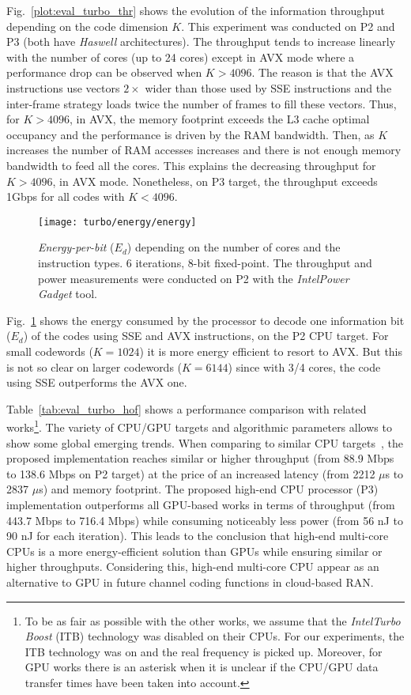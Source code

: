 Fig.~\ref{plot:eval_turbo_thr} shows the evolution of the information throughput
depending on the code dimension $K$. This experiment was conducted on P2 and P3
(both have \emph{ Haswell} architectures). The throughput tends to increase
linearly with the number of cores (up to 24 cores) except in AVX mode where a
performance drop can be observed when $K > 4096$. The reason is that the AVX
instructions use vectors $2\times$ wider than those used by SSE instructions and
the inter-frame strategy loads twice the number of frames to fill these vectors.
Thus, for $K > 4096$, in AVX, the memory footprint exceeds the L3 cache optimal
occupancy and the performance is driven by the RAM bandwidth. Then, as $K$
increases the number of RAM accesses increases and there is not enough memory
bandwidth to feed all the cores. This explains the decreasing throughput for
$K > 4096$, in AVX mode. Nonetheless, on P3 target, the throughput exceeds 1Gbps
for all codes with $K<4096$.

\begin{figure}[htp]
  \centering
  \texttt{[image: turbo/energy/energy]}
  \caption{\emph{Energy-per-bit} ($E_d$) depending on the number of cores and
    the instruction types. 6 iterations, 8-bit fixed-point. The throughput and
    power measurements were conducted on P2 with the
    \emph{Intel\R Power Gadget} tool.}
  \label{plot:eval_turbo_energy}
\end{figure}

Fig.~\ref{plot:eval_turbo_energy} shows the energy consumed by the processor to
decode one information bit ($E_d$) of the codes using SSE and AVX instructions,
on the P2 CPU target. For small codewords ($K=1024$) it is more energy efficient
to resort to AVX. But this is not so clear on larger codewords ($K=6144$) since
with 3/4 cores, the code using SSE outperforms the AVX one.

Table~\ref{tab:eval_turbo_hof} shows a performance comparison with related
works\footnote{To be as fair as possible with the other works, we assume that
the \emph{Intel\R Turbo Boost} (ITB) technology was disabled on their CPUs. For
our experiments, the ITB technology was on and the real frequency is picked up.
Moreover, for GPU works there is an asterisk when it is unclear if the CPU/GPU
data transfer times have been taken into account.}. The variety of CPU/GPU
targets and algorithmic parameters allows to show some global emerging trends.
When comparing to similar CPU targets~\cite{Zhang2012,Wu2013}, the proposed
implementation reaches similar or higher throughput (from 88.9 Mbps to 138.6
Mbps on P2 target) at the price of an increased latency (from 2212 $\mu$s to
2837 $\mu$s) and memory footprint. The proposed high-end CPU processor (P3)
implementation outperforms all GPU-based works in terms of throughput (from
443.7 Mbps to 716.4 Mbps) while consuming noticeably less power (from 56 nJ to
90 nJ for each iteration). This leads to the conclusion that high-end multi-core
CPUs is a more energy-efficient solution than GPUs while ensuring similar or
higher throughputs. Considering this, high-end multi-core CPU appear as an
alternative to GPU in future channel coding functions in cloud-based RAN.

